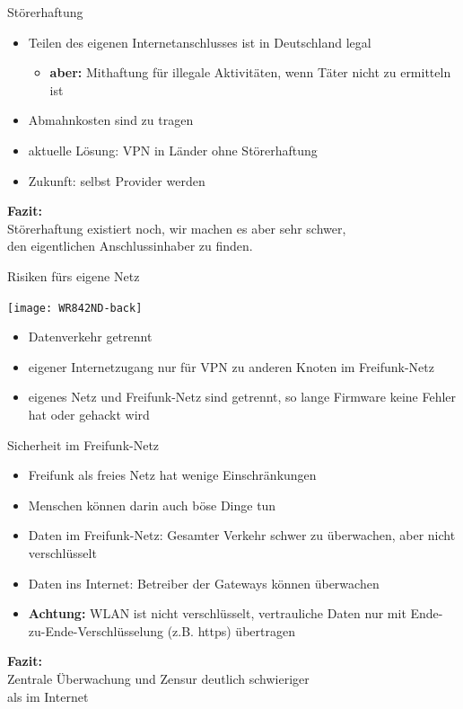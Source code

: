 \documentclass{beamer}
\begin{document}
\begin{frame}{Störerhaftung}
\begin{itemize}
\pause\item Teilen des eigenen Internetanschlusses ist in Deutschland legal
\begin{itemize}
	\pause\item \textbf{aber:} Mithaftung für illegale Aktivitäten, wenn Täter nicht zu ermitteln ist
\end{itemize}
\pause\item Abmahnkosten sind zu tragen
\vfill
\pause\item aktuelle Lösung: VPN in Länder ohne Störerhaftung
\pause\item Zukunft: selbst Provider werden
\end{itemize}
\vfill
\centering
\pause \textbf{Fazit:}\\Störerhaftung existiert noch, wir machen es aber sehr schwer,\\den eigentlichen Anschlussinhaber zu finden.

\end{frame}

\begin{frame}{Risiken fürs eigene Netz}
\vfill
\begin{center}
\texttt{[image: WR842ND-back]}
\end{center}
\begin{itemize}
\pause\item Datenverkehr getrennt
\pause\item eigener Internetzugang nur für VPN zu anderen Knoten im Freifunk-Netz
\pause\item eigenes Netz und Freifunk-Netz sind getrennt, so lange Firmware keine Fehler hat oder gehackt wird
\end{itemize}
\vfill
\end{frame}

\begin{frame}{Sicherheit im Freifunk-Netz}
\begin{itemize}
	\pause\item Freifunk als freies Netz hat wenige Einschränkungen
	\pause\item Menschen können darin auch böse Dinge tun
	\vfill
	\pause\item Daten im Freifunk-Netz: Gesamter Verkehr schwer zu überwachen, aber nicht verschlüsselt
	\pause\item Daten ins Internet: Betreiber der Gateways können überwachen
	\vfill
\pause\item \textbf{Achtung:} WLAN ist nicht verschlüsselt, vertrauliche Daten nur mit Ende-zu-Ende-Verschlüsselung (z.B. https) übertragen
\vfill
\end{itemize}
\centering
\textbf{Fazit:}\\Zentrale Überwachung und Zensur deutlich schwieriger \\ als im Internet
\end{frame}
\end{document}
